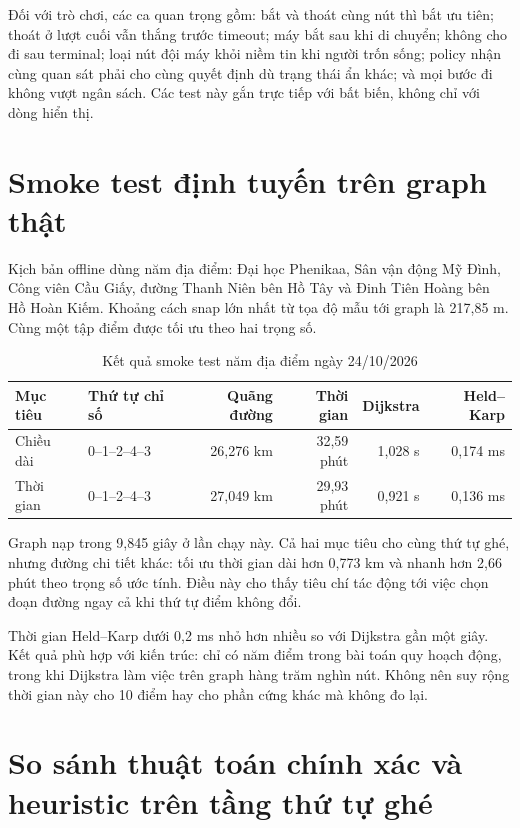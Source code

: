 Đối với trò chơi, các ca quan trọng gồm: bắt và thoát cùng nút thì bắt ưu tiên;
thoát ở lượt cuối vẫn thắng trước timeout; máy bắt sau khi di chuyển; không cho đi
sau terminal; loại nút đội máy khỏi niềm tin khi người trốn sống; policy nhận cùng
quan sát phải cho cùng quyết định dù trạng thái ẩn khác; và mọi bước đi không vượt
ngân sách. Các test này gắn trực tiếp với bất biến, không chỉ với dòng hiển thị.

\section{Smoke test định tuyến trên graph thật}

Kịch bản offline dùng năm địa điểm: Đại học Phenikaa, Sân vận động Mỹ Đình, Công
viên Cầu Giấy, đường Thanh Niên bên Hồ Tây và Đinh Tiên Hoàng bên Hồ Hoàn Kiếm.
Khoảng cách snap lớn nhất từ tọa độ mẫu tới graph là 217,85 m. Cùng một tập điểm
được tối ưu theo hai trọng số.

\begin{table}[H]
\centering
\caption{Kết quả smoke test năm địa điểm ngày 24/10/2026}
\begin{tabularx}{\linewidth}{p{3.0cm}Y r r r r}
\toprule
\textbf{Mục tiêu} & \textbf{Thứ tự chỉ số} & \textbf{Quãng đường} &
\textbf{Thời gian} & \textbf{Dijkstra} & \textbf{Held--Karp} \\
\midrule
Chiều dài & 0--1--2--4--3 & 26,276 km & 32,59 phút & 1,028 s & 0,174 ms \\
Thời gian & 0--1--2--4--3 & 27,049 km & 29,93 phút & 0,921 s & 0,136 ms \\
\bottomrule
\end{tabularx}
\end{table}

Graph nạp trong 9,845 giây ở lần chạy này. Cả hai mục tiêu cho cùng thứ tự ghé,
nhưng đường chi tiết khác: tối ưu thời gian dài hơn 0,773 km và nhanh hơn 2,66
phút theo trọng số ước tính. Điều này cho thấy tiêu chí tác động tới việc chọn
đoạn đường ngay cả khi thứ tự điểm không đổi.

Thời gian Held--Karp dưới 0,2 ms nhỏ hơn nhiều so với Dijkstra gần một giây. Kết
quả phù hợp với kiến trúc: chỉ có năm điểm trong bài toán quy hoạch động, trong
khi Dijkstra làm việc trên graph hàng trăm nghìn nút. Không nên suy rộng thời
gian này cho 10 điểm hay cho phần cứng khác mà không đo lại.

\section{So sánh thuật toán chính xác và heuristic trên tầng thứ tự ghé}
\label{sec:benchmark-tsp}

